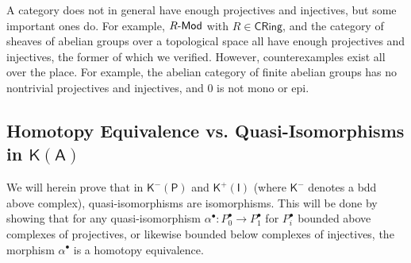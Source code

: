 A category does not in general have enough projectives and injectives, but some important ones do. For example, $R\text{-}\mathsf{Mod} $ with $R\in \mathsf{CRing} $, and the category of sheaves of abelian groups over a topological space all have enough projectives and injectives, the former of which we verified. However, counterexamples exist all over the place. For example, the abelian category of finite abelian groups has no nontrivial projectives and injectives, and $0$ is not mono or epi.

\subsection{Homotopy Equivalence vs. Quasi-Isomorphisms in $\mathsf{K} (\mathsf{A} )$}
We will herein prove that in $\mathsf{K} ^{-} (\mathsf{P} )$ and $\mathsf{K} ^{+} (\mathsf{I} )$ (where $\mathsf{K} ^{-} $ denotes a bdd above complex), quasi-isomorphisms are isomorphisms. This will be done by showing that for any quasi-isomorphism $\alpha ^{\bullet} : P_0^{\bullet}  \to P_1^{\bullet} $ for $P^{\bullet}_i$ bounded above complexes of projectives, or likewise bounded below complexes of injectives, the morphism $\alpha ^{\bullet} $ is a homotopy equivalence.

